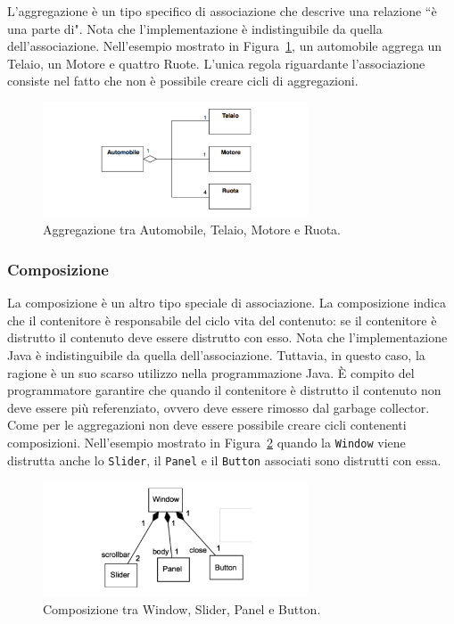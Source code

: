 \documentclass{article}
\begin{document}
L'aggregazione \`e un tipo specifico di associazione che descrive una relazione ``\`e una parte di". Nota che l'implementazione \`e indistinguibile da quella dell'associazione. Nell'esempio mostrato in Figura~\ref{Fig:Aggregazione}, un automobile aggrega un Telaio, un Motore e quattro Ruote. L'unica regola riguardante l'associazione consiste nel fatto che non \`e possibile creare cicli di aggregazioni. 

\begin{figure}[h!]
  \centering
    \includegraphics[width=0.7\textwidth]{Img/Aggregazione.pdf}
      \caption{Aggregazione tra Automobile, Telaio, Motore e Ruota.}
      \label{Fig:Aggregazione}
\end{figure}

\subsubsection{Composizione}
La composizione \`e un altro tipo speciale di associazione. La composizione indica che il contenitore \`e responsabile del ciclo vita del contenuto: se il contenitore \`e distrutto il contenuto deve essere distrutto con esso.
Nota che l'implementazione Java \`e indistinguibile da quella dell'associazione. Tuttavia, in questo caso, la ragione \`e un suo scarso utilizzo nella programmazione Java. \`E compito del programmatore garantire che quando il contenitore \`e distrutto il contenuto non deve essere pi\`u referenziato, ovvero deve essere rimosso dal garbage collector. Come per le aggregazioni non deve essere possibile creare cicli contenenti composizioni.
Nell'esempio mostrato in Figura~\ref{Fig:Composizione} quando la \texttt{Window} viene distrutta anche lo \texttt{Slider}, il \texttt{Panel} e il \texttt{Button} associati sono distrutti con essa.

\begin{figure}[h!]
  \centering
    \includegraphics[width=0.7\textwidth]{Img/Composizione.pdf}
      \caption{Composizione tra Window, Slider, Panel e Button.}
      \label{Fig:Composizione}
\end{figure}
\end{document}

